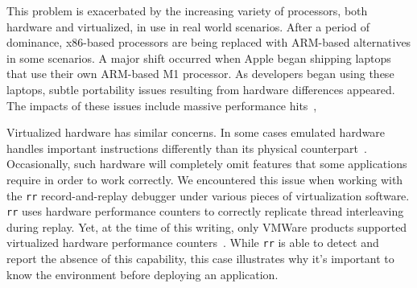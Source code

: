 This problem is exacerbated by the increasing variety of processors, both hardware and virtualized, in use in real world scenarios.
After a period of dominance,
x86-based processors are being replaced with ARM-based alternatives in some scenarios.
A major shift occurred when Apple began shipping laptops that use their own ARM-based M1 processor.
As developers began using these laptops,
subtle portability issues resulting from hardware differences appeared.
The impacts of these issues include massive performance hits~\cite{ghccompile}, 

Virtualized hardware has similar concerns.
In some cases emulated hardware handles important instructions differently than its physical counterpart~\cite{unicornbug}.
Occasionally,
such hardware will completely omit features that some applications require in order to work correctly.
We encountered this issue when working with the {\tt rr}
record-and-replay debugger under various pieces of virtualization software.
{\tt rr} uses hardware performance counters to correctly replicate thread interleaving during replay. Yet,
at the time of this writing,
only VMWare products supported virtualized hardware performance counters~\cite{vmwarecounters}.
While {\tt rr} is able to detect and report the absence of this capability,
this case illustrates why it's important to  know the environment before deploying an application.




